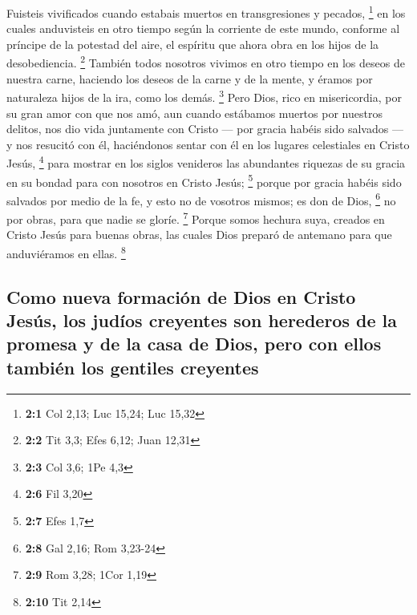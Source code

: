 \begin{paracol}{2}
 Fuisteis vivificados cuando estabais muertos en
transgresiones y pecados, \footnote{\textbf{2:1} Col 2,13; Luc 15,24;
  Luc 15,32}  en los cuales anduvisteis en otro tiempo
según la corriente de este mundo, conforme al príncipe de la potestad
del aire, el espíritu que ahora obra en los hijos de la desobediencia.
\footnote{\textbf{2:2} Tit 3,3; Efes 6,12; Juan 12,31} 
También todos nosotros vivimos en otro tiempo en los deseos de nuestra
carne, haciendo los deseos de la carne y de la mente, y éramos por
naturaleza hijos de la ira, como los demás. \footnote{\textbf{2:3} Col
  3,6; 1Pe 4,3}  Pero Dios, rico en misericordia, por su
gran amor con que nos amó,  aun cuando estábamos muertos
por nuestros delitos, nos dio vida juntamente con Cristo --- por gracia
habéis sido salvados ---  y nos resucitó con él,
haciéndonos sentar con él en los lugares celestiales en Cristo Jesús,
\footnote{\textbf{2:6} Fil 3,20}  para mostrar en los
siglos venideros las abundantes riquezas de su gracia en su bondad para
con nosotros en Cristo Jesús; \footnote{\textbf{2:7} Efes 1,7}
 porque por gracia habéis sido salvados por medio de la
fe, y esto no de vosotros mismos; es don de Dios, \footnote{\textbf{2:8}
  Gal 2,16; Rom 3,23-24}  no por obras, para que nadie se
gloríe. \footnote{\textbf{2:9} Rom 3,28; 1Cor 1,19} 
Porque somos hechura suya, creados en Cristo Jesús para buenas obras,
las cuales Dios preparó de antemano para que anduviéramos en ellas.
\footnote{\textbf{2:10} Tit 2,14}

\hypertarget{como-nueva-formaciuxf3n-de-dios-en-cristo-jesuxfas-los-juduxedos-creyentes-son-herederos-de-la-promesa-y-de-la-casa-de-dios-pero-con-ellos-tambiuxe9n-los-gentiles-creyentes}{%
\subsection{Como nueva formación de Dios en Cristo Jesús, los judíos
creyentes son herederos de la promesa y de la casa de Dios, pero con
ellos también los gentiles
creyentes}\label{como-nueva-formaciuxf3n-de-dios-en-cristo-jesuxfas-los-juduxedos-creyentes-son-herederos-de-la-promesa-y-de-la-casa-de-dios-pero-con-ellos-tambiuxe9n-los-gentiles-creyentes}}


\end{paracol}
